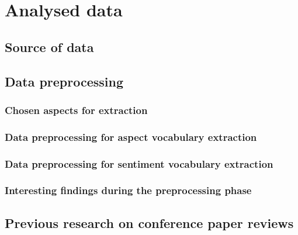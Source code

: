 \chapter{Analysed data}
\section{Source of data}
\section{Data preprocessing}
\subsection{Chosen aspects for extraction}
\subsection{Data preprocessing for aspect vocabulary extraction}
\subsection{Data preprocessing for sentiment vocabulary extraction}
\subsection{Interesting findings during the preprocessing phase}
\section{Previous research on conference paper reviews}
